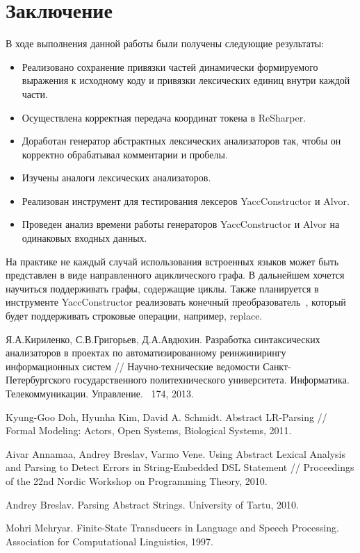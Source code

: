 \section*{Заключение}
В ходе выполнения данной работы были получены следующие результаты:
\begin{itemize}
\item Реализовано сохранение привязки частей динамически формируемого выражения к исходному коду и привязки лексических единиц внутри каждой части.
\item Осуществлена корректная передача координат токена в ReSharper.
\item Доработан генератор абстрактных лексических анализаторов так, чтобы он корректно обрабатывал комментарии и пробелы.
\item Изучены аналоги лексических анализаторов.
\item Реализован инструмент для тестирования лексеров YaccConstructor и Alvor.
\item Проведен анализ времени работы генераторов YaccConstructor и Alvor на одинаковых входных данных.
\end{itemize}

На практике не каждый случай использования встроенных языков может быть представлен в виде направленного ациклического графа. 
В дальнейшем хочется научиться поддерживать графы, содержащие циклы. Также планируется в инструменте YaccConstructor реализовать 
конечный преобразователь~\cite{Mehryar}, который будет поддерживать строковые операции, например, replace.

\begin{thebibliography}{99}
Я.А.Кириленко, С.В.Григорьев, Д.А.Авдюхин.
Разработка синтаксических анализаторов в проектах по автоматизированному реинжинирингу информационных систем //
Научно-технические ведомости Санкт-Петербургского государственного политехнического университета. Информатика. Телекоммуникации. Управление.
\textnumero~174, 2013.

Kyung-Goo Doh, Hyunha Kim, David A. Schmidt.
Abstract LR-Parsing // Formal Modeling: Actors, Open Systems, Biological Systems, 2011.

Aivar Annamaa, Andrey Breslav, Varmo Vene.
Using Abstract Lexical Analysis and Parsing to Detect Errors in String-Embedded DSL Statement //
Proceedings of the 22nd Nordic Workshop on Programming Theory, 2010.

Andrey Breslav. Parsing Abstract Strings. University of Tartu, 2010.

Mohri Mehryar. Finite-State Transducers in Language and Speech Processing. Association for Computational Linguistics, 
1997.
\end{thebibliography}
